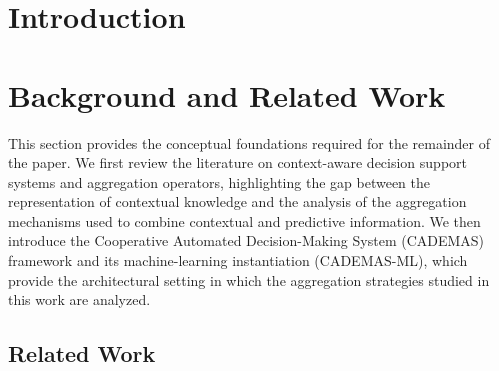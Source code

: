 \documentclass[mathematics,article,submit,moreauthors]{Definitions/mdpi}
\begin{document}

\section{Introduction}

\section{Background and Related Work}


This section provides the conceptual foundations required for the remainder
of the paper. We first review the literature on context-aware decision
support systems and aggregation operators, highlighting the gap between
the representation of contextual knowledge and the analysis of the
aggregation mechanisms used to combine contextual and predictive
information. We then introduce the Cooperative Automated Decision-Making
System (CADEMAS) framework and its machine-learning instantiation
(CADEMAS-ML), which provide the architectural setting in which the
aggregation strategies studied in this work are analyzed.

\subsection{Related Work}
\label{subsec:related-work}
\end{document}
